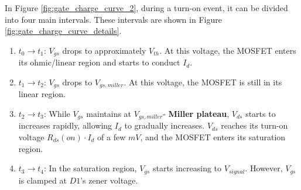\documentclass[main.tex]{subfiles}
\begin{document}
    \justify
    In Figure \ref{fig:gate_charge_curve_2}, during a turn-on event, it can be divided into four main intervals. These intervals are shown in Figure \ref{fig:gate_charge_curve_details}.
    \begin{enumerate}
        \item $t_0 \rightarrow t_1$: $V_{gs}$ drops to approximately $V_{th}$. At this voltage, the MOSFET enters its ohmic/linear region and starts to conduct $I_d$.
        \item $t_1 \rightarrow t_2$: $V_{gs}$ drops to $V_{gs,miller}$. At this voltage, the MOSFET is still in its linear region.
        \item $t_2 \rightarrow t_3$: While $V_{gs}$ maintains at $V_{gs,miller}$- \textbf{Miller plateau}, $V_{ds}$ starts to increases rapidly, allowing $I_d$ to gradually increases. $V_{ds}$ reaches its turn-on voltage $R_{ds}(on)\cdot I_d$ of a few $mV$, and the MOSFET enters its saturation region.
        \item $t_3 \rightarrow t_4$: In the saturation region, $V_{gs}$ starts increasing to $V_{signal}$. However, $V_{gs}$ is clamped at $D1$'s zener voltage. 
    \end{enumerate}
\end{document}
